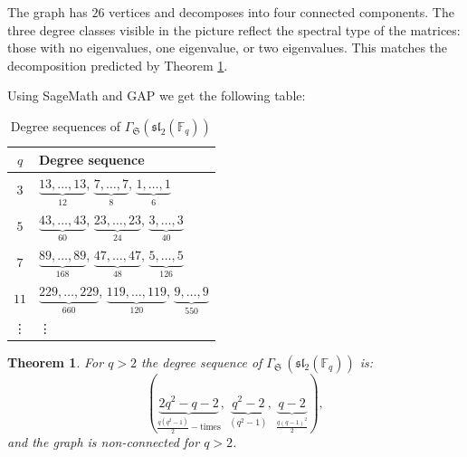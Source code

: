 \documentclass[11pt]{amsart}
\theoremstyle{plain}
\newtheorem{theorem}{Theorem}[section]
\def\F{\mathbb{F}}
\begin{document}
The graph has $26$ vertices and decomposes into four connected components. The three degree classes visible in the picture reflect the spectral type of the matrices: those with no eigenvalues, one eigenvalue, or two eigenvalues. This matches the decomposition predicted by Theorem \ref{sl2-degree-seq}.

\quad

Using SageMath and GAP we get the following table:
 
\begin{table}[H]
\centering
\caption{Degree sequences of $\Gamma_{\mathfrak S} (\mathfrak{sl}_2(\F_q))$}
\renewcommand{\arraystretch}{1.25}
\begin{tabular}{c|l}
\hline
$q$ & Degree sequence \\ \hline 
$3$  & $\underbrace{13,\ldots, 13}_{12}$, $\underbrace{7,\ldots, 7}_{8}$, $\underbrace{1,\ldots, 1}_{6}$\\[2pt] \hline
$5$  & $\underbrace{43,\ldots, 43}_{60}$, $\underbrace{23,\ldots, 23}_{24}$, $\underbrace{3,\ldots, 3}_{40}$\\[2pt] \hline
$7$  & $\underbrace{89,\ldots, 89}_{168}$, $\underbrace{47,\ldots, 47}_{48}$, $\underbrace{5,\ldots, 5}_{126}$\\[2pt] \hline
$11$ & $\underbrace{229,\ldots, 229}_{660}$, $\underbrace{119,\ldots, 119}_{120}$, $\underbrace{9,\ldots, 9}_{550}$\\ \hline
\vdots  & \vdots \\ %
\end{tabular}
\end{table}


\quad

\begin{theorem}\label{sl2-degree-seq}
For $q>2$ the degree sequence of $\Gamma_{\mathfrak S}\,(\mathfrak{sl}_2(\F_q))$ is:
\begin{equation*}
(\underbrace{2q^{2}-q-2}_{\frac{q(q^2-1)}{2}-\text{times}}, \ \underbrace{q^{2}-2}_{(q^2-1)}, \ \underbrace{q-2}_{\frac{q(q-1)^2}{2}}),
\end{equation*}
and the graph is non-connected for $q>2$.
\end{theorem}

\end{document}
